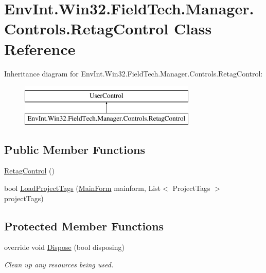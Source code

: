 \hypertarget{class_env_int_1_1_win32_1_1_field_tech_1_1_manager_1_1_controls_1_1_retag_control}{}\section{Env\+Int.\+Win32.\+Field\+Tech.\+Manager.\+Controls.\+Retag\+Control Class Reference}
\label{class_env_int_1_1_win32_1_1_field_tech_1_1_manager_1_1_controls_1_1_retag_control}
Inheritance diagram for Env\+Int.\+Win32.\+Field\+Tech.\+Manager.\+Controls.\+Retag\+Control\+:\begin{figure}[H]
\begin{center}
\leavevmode
\includegraphics[height=2.000000cm]{class_env_int_1_1_win32_1_1_field_tech_1_1_manager_1_1_controls_1_1_retag_control}
\end{center}
\end{figure}
\subsection*{Public Member Functions}
\begin{DoxyCompactItemize}
\item 
\hyperlink{class_env_int_1_1_win32_1_1_field_tech_1_1_manager_1_1_controls_1_1_retag_control_a9544e63a36c00fb5ff73c1e42a1dbaff}{Retag\+Control} ()
\item 
bool \hyperlink{class_env_int_1_1_win32_1_1_field_tech_1_1_manager_1_1_controls_1_1_retag_control_a35e2fc1f869c696d3b38234584948aa0}{Load\+Project\+Tags} (\hyperlink{class_env_int_1_1_win32_1_1_field_tech_1_1_manager_1_1_main_form}{Main\+Form} mainform, List$<$ Project\+Tags $>$ project\+Tags)
\end{DoxyCompactItemize}
\subsection*{Protected Member Functions}
\begin{DoxyCompactItemize}
\item 
override void \hyperlink{class_env_int_1_1_win32_1_1_field_tech_1_1_manager_1_1_controls_1_1_retag_control_a9d5e5672c0a2e57eb737ffd1ad07371e}{Dispose} (bool disposing)
\begin{DoxyCompactList}\small\item\em Clean up any resources being used. \end{DoxyCompactList}\end{DoxyCompactItemize}


